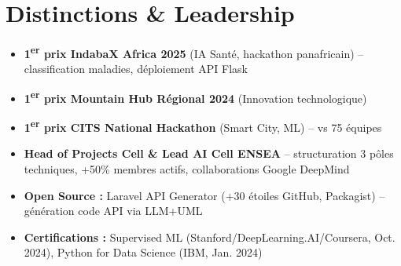 \documentclass[a4paper,11pt]{article}
\begin{document}
\section{Distinctions \& Leadership}
\begin{itemize}[leftmargin=*, label=\tiny$\bullet$, nosep]
    \item \small{\textbf{1\textsuperscript{er} prix IndabaX Africa 2025} (IA Santé, hackathon panafricain) -- classification maladies, déploiement API Flask}
    \item \small{\textbf{1\textsuperscript{er} prix Mountain Hub Régional 2024} (Innovation technologique)}
    \item \small{\textbf{1\textsuperscript{er} prix CITS National Hackathon} (Smart City, ML) -- vs 75 équipes}
    \item \small{\textbf{Head of Projects Cell \& Lead AI Cell ENSEA} -- structuration 3 pôles techniques, +50\% membres actifs, collaborations Google DeepMind}
    \item \small{\textbf{Open Source :} Laravel API Generator (+30 étoiles GitHub, Packagist) -- génération code API via LLM+UML}
    \item \small{\textbf{Certifications :} Supervised ML (Stanford/DeepLearning.AI/Coursera, Oct. 2024), Python for Data Science (IBM, Jan. 2024)}
\end{itemize}
\end{document}
